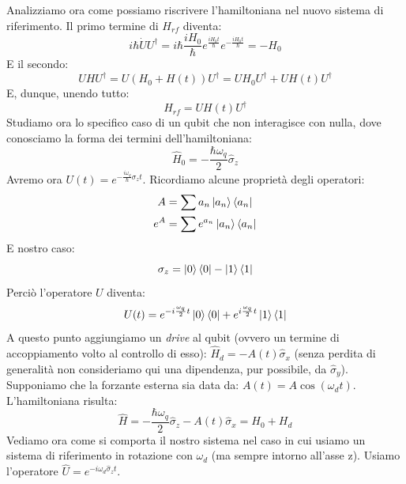 \vspace{0.5cm}
\noindent {}
\vspace{0.5cm}
Analizziamo ora come possiamo riscrivere l'hamiltoniana nel nuovo sistema di riferimento.
Il primo termine di $H_{rf}$ diventa:
\begin{equation*}
    i\hbar \dot U U^\dagger = i \hbar \frac{i H_0}{\hbar} e^{\frac{i H_0 t}{\hbar}}e^{-\frac{i H_0 t}{\hbar}}=-H_0
\end{equation*}
E il secondo:
\begin{equation*}
    UHU^\dagger = U(H_0 + H(t)) U^\dagger = UH_0 U^\dagger + U H(t) U^\dagger
\end{equation*}
E, dunque, unendo tutto:
\begin{equation*}
    H_{rf} = U H(t)U^\dagger
\end{equation*}
Studiamo ora lo specifico caso di un qubit che non interagisce con nulla, dove conosciamo la forma dei termini dell'hamiltoniana:
\begin{equation*}
    \hat H_0 = -\frac{\hbar \omega_q}{2}\hat \sigma_z
\end{equation*}
Avremo ora $U(t)=e^{-\frac{i\omega_q}{\hbar}\sigma_z t}$. 
Ricordiamo alcune proprietà degli operatori:
\begin{align*}
    A &= \sum a_n \ket{a_n} \bra{a_n} \\
    e^A &= \sum e^{a_n}\ket{a_n}\bra{a_n}
\end{align*}
E nostro caso:
\begin{equation*}
    \sigma_z = \ket 0 \bra 0 - \ket 1 \bra 1 
\end{equation*}
Perciò l'operatore $U$ diventa:
\begin{equation*}
    U(t) = e^{-i\frac{\omega_q}{2}t}\ket 0 \bra 0 + e^{i\frac{\omega_q}{2}t}\ket 1 \bra 1
\end{equation*}
A questo punto aggiungiamo un \textit{drive} al qubit (ovvero un termine di accoppiamento volto al controllo di esso): $\hat H_d = -A(t) \hat \sigma_x$ (senza perdita di generalità non consideriamo qui una dipendenza, pur possibile, da $\hat \sigma_y$).
Supponiamo che la forzante esterna sia data da: $A(t) = A\cos \left( \omega_d t \right)$.
L'hamiltoniana risulta:
\begin{equation*}
    \hat H = - \frac{\hbar \omega_q}{2}\hat \sigma_z -A (t) \hat \sigma_x = H_0 + H_d
\end{equation*}
Vediamo ora come si comporta il nostro sistema nel caso in cui usiamo un sistema di riferimento in rotazione con $\omega_d$ (ma sempre intorno all'asse z). Usiamo l'operatore $\hat U= e^{-i \omega_d \hat \sigma_z t}$.
